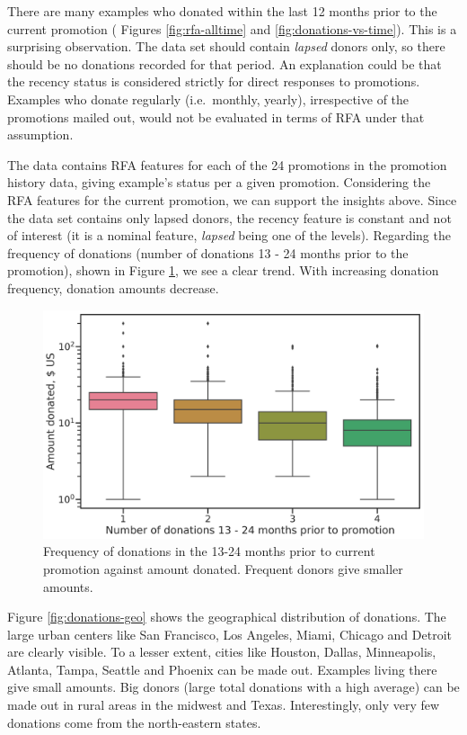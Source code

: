 \documentclass[
  11pt,
  a4paper,
  DIV=12,captions=tableheading,oneside,titlepage]{scrbook}
\begin{document}
There are many examples who donated within the last 12 months prior to the current promotion ( Figures \ref{fig:rfa-alltime} and \ref{fig:donations-vs-time}). This is a surprising observation. The data set should contain \emph{lapsed} donors only, so there should be no donations recorded for that period. An explanation could be that the recency status is considered strictly for direct responses to promotions. Examples who donate regularly (i.e.~monthly, yearly), irrespective of the promotions mailed out, would not be evaluated in terms of RFA under that assumption.

The data contains RFA features for each of the 24 promotions in the promotion history data, giving example's status per a given promotion. Considering the RFA features for the current promotion, we can support the insights above. Since the data set contains only lapsed donors, the recency feature is constant and not of interest (it is a nominal feature, \emph{lapsed} being one of the levels). Regarding the frequency of donations (number of donations 13 - 24 months prior to the promotion), shown in Figure \ref{fig:rfa-f}, we see a clear trend. With increasing donation frequency, donation amounts decrease.

\begin{figure}

{\centering \includegraphics[width=0.7\linewidth]{figures/eda/frequency-past-donatios-vs-donations} 

}

\caption{Frequency of donations in the 13-24 months prior to current promotion against amount donated. Frequent donors give smaller amounts.}\label{fig:rfa-f}
\end{figure}

Figure \ref{fig:donations-geo} shows the geographical distribution of donations. The large urban centers like San Francisco, Los Angeles, Miami, Chicago and Detroit are clearly visible. To a lesser extent, cities like Houston, Dallas, Minneapolis, Atlanta, Tampa, Seattle and Phoenix can be made out. Examples living there give small amounts. Big donors (large total donations with a high average) can be made out in rural areas in the midwest and Texas. Interestingly, only very few donations come from the north-eastern states.
\end{document}
